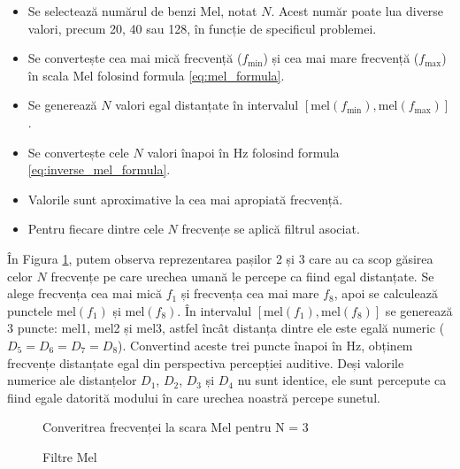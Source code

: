 \begin{itemize}
    \item Se selectează numărul de benzi Mel, notat \( N \). Acest număr poate lua diverse valori, precum 20, 40 sau 128, în funcție de specificul problemei.
    \item Se convertește cea mai mică frecvență (\( f_{\text{min}} \)) și cea mai mare frecvență (\( f_{\text{max}} \)) în scala Mel folosind formula \eqref{eq:mel_formula}.
    \item Se generează \( N \) valori egal distanțate în intervalul \([ \text{mel}(f_{\text{min}}), \text{mel}(f_{\text{max}}) ]\).
    \item Se convertește cele \( N \) valori înapoi în Hz folosind formula \eqref{eq:inverse_mel_formula}.
    \item Valorile sunt aproximative la cea mai apropiată frecvență.
    \item Pentru fiecare dintre cele \( N \) frecvențe se aplică filtrul asociat.
\end{itemize}

În Figura \ref{fig:algoritmMel}, putem observa reprezentarea pașilor 2 și 3 care au ca scop găsirea celor \( N \) frecvențe pe care urechea umană le percepe ca fiind egal distanțate. Se alege frecvența cea mai mică \( f_1 \) și frecvența cea mai mare \( f_8 \), apoi se calculează punctele \(\text{mel}(f_1)\) și \(\text{mel}(f_8)\). În intervalul \([\text{mel}(f_1), \text{mel}(f_8)]\) se generează 3 puncte: mel1, mel2 și mel3, astfel încât distanța dintre ele este egală numeric (\(D_5 = D_6 = D_7 = D_8\)). Convertind aceste trei puncte înapoi în Hz, obținem frecvențe distanțate egal din perspectiva percepției auditive. Deși valorile numerice ale distanțelor \(D_1\), \(D_2\), \(D_3\) și \(D_4\) nu sunt identice, ele sunt percepute ca fiind egale datorită modului în care urechea noastră percepe sunetul.

\begin{figure}
    \centering
    
    \caption{Converitrea frecvenței la scara Mel pentru N = 3}
    \label{fig:algoritmMel}
\end{figure}

\begin{figure}
    \centering
    
    \caption{Filtre Mel}
    \label{fig:filtreTriunghiulareMel}
\end{figure}


